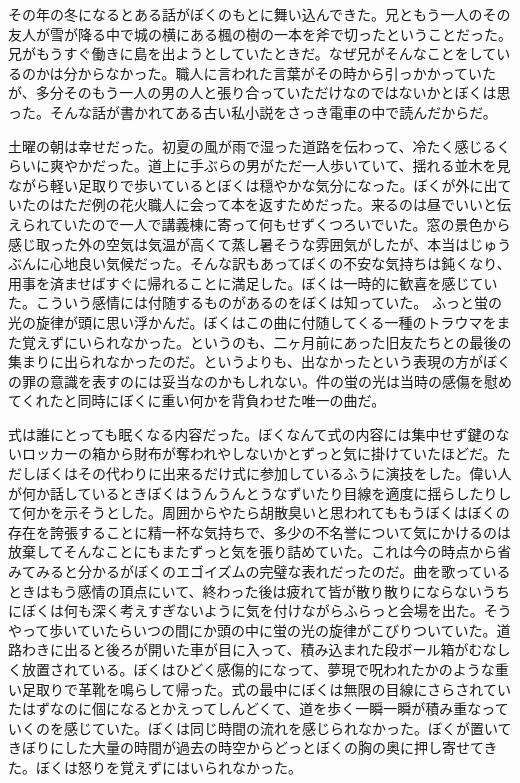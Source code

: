 \documentclass[b5j,twoside,twocolumn]{utarticle}
\begin{document}
その年の冬になるとある話がぼくのもとに舞い込んできた。兄ともう一人のその友人が雪が降る中で城の横にある楓の樹の一本を斧で切ったということだった。兄がもうすぐ働きに島を出ようとしていたときだ。なぜ兄がそんなことをしているのかは分からなかった。職人に言われた言葉がその時から引っかかっていたが、多分そのもう一人の男の人と張り合っていただけなのではないかとぼくは思った。そんな話が書かれてある古い私小説をさっき電車の中で読んだからだ。


土曜の朝は幸せだった。初夏の風が雨で湿った道路を伝わって、冷たく感じるくらいに爽やかだった。道上に手ぶらの男がただ一人歩いていて、揺れる並木を見ながら軽い足取りで歩いているとぼくは穏やかな気分になった。ぼくが外に出ていたのはただ例の花火職人に会って本を返すためだった。来るのは昼でいいと伝えられていたので一人で講義棟に寄って何もせずくつろいでいた。窓の景色から感じ取った外の空気は気温が高くて蒸し暑そうな雰囲気がしたが、本当はじゅうぶんに心地良い気候だった。そんな訳もあってぼくの不安な気持ちは鈍くなり、用事を済ませばすぐに帰れることに満足した。ぼくは一時的に歓喜を感じていた。こういう感情には付随するものがあるのをぼくは知っていた。
ふっと蛍の光の旋律が頭に思い浮かんだ。ぼくはこの曲に付随してくる一種のトラウマをまた覚えずにいられなかった。というのも、二ヶ月前にあった旧友たちとの最後の集まりに出られなかったのだ。というよりも、出なかったという表現の方がぼくの罪の意識を表すのには妥当なのかもしれない。件の蛍の光は当時の感傷を慰めてくれたと同時にぼくに重い何かを背負わせた唯一の曲だ。


式は誰にとっても眠くなる内容だった。ぼくなんて式の内容には集中せず鍵のないロッカーの箱から財布が奪われやしないかとずっと気に掛けていたほどだ。ただしぼくはその代わりに出来るだけ式に参加しているふうに演技をした。偉い人が何か話しているときぼくはうんうんとうなずいたり目線を適度に揺らしたりして何かを示そうとした。周囲からやたら胡散臭いと思われてももうぼくはぼくの存在を誇張することに精一杯な気持ちで、多少の不名誉について気にかけるのは放棄してそんなことにもまたずっと気を張り詰めていた。これは今の時点から省みてみると分かるがぼくのエゴイズムの完璧な表れだったのだ。曲を歌っているときはもう感情の頂点にいて、終わった後は疲れて皆が散り散りにならないうちにぼくは何も深く考えすぎないように気を付けながらふらっと会場を出た。そうやって歩いていたらいつの間にか頭の中に蛍の光の旋律がこびりついていた。道路わきに出ると後ろが開いた車が目に入って、積み込まれた段ボール箱がむなしく放置されている。ぼくはひどく感傷的になって、夢現で呪われたかのような重い足取りで革靴を鳴らして帰った。式の最中にぼくは無限の目線にさらされていたはずなのに個になるとかえってしんどくて、道を歩く一瞬一瞬が積み重なっていくのを感じていた。ぼくは同じ時間の流れを感じられなかった。ぼくが置いてきぼりにした大量の時間が過去の時空からどっとぼくの胸の奥に押し寄せてきた。ぼくは怒りを覚えずにはいられなかった。
\end{document}
